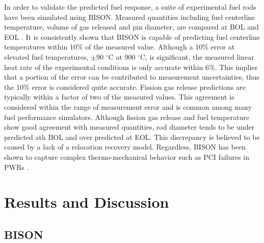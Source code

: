 \documentclass[edeposit,fullpage,11pt]{uiucthesis2009}
\begin{document}
In order to validate the predicted fuel response, a suite of experimental fuel rods have been simulated using BISON.
Measured quantities including fuel centerline temperature, volume of gas released and pin diameter, are compared at \gls{BOL} and \gls{EOL} \cite{williamson_bison_year}.
It is consistently shown that BISON is capable of predicting fuel centerline temperatures within 10\% of the measured value.
Although a 10\% error at elevated fuel temperatures, $\pm$90 $^\circ$C at 900 $^\circ$C, is significant, the measured linear heat rate of the experimental conditions is only accurate within 6\%. 
This implies that a portion of the error can be contributed to measurement uncertainties, thus the 10\% error is considered quite accurate.
Fission gas release predictions are typically within a factor of two of the measured values.
This agreement is considered within the range of measurement error and is common among many fuel performance simulators.
Although fission gas release and fuel temperature show good agreement with measured quantities, rod diameter tends to be under predicted ath \gls{BOL} and over predicted at \gls{EOL}.
This discrepancy is believed to be caused by a lack of a relocation recovery model.
Regardless, BISON has been shown to capture complex thermo-mechanical behavior such as PCI failures in PWRs \cite{montgomery_advanced_2014,capps_pci_2016}.

 





\chapter{Results and Discussion}

\section{BISON}
\end{document}

